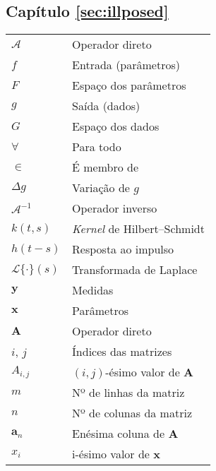 \begin{multicols}{2}

\subsection*{Capítulo \ref{sec:illposed}}
\noindent\begin{tabular}{ m{1.3cm} m{6.2cm}}
$\mathcal{A}$ & Operador direto \\
$ f $ &Entrada (parâmetros) \\
$F$  & Espaço dos parâmetros\\
$g$ &Saída (dados)  \\
$G$  & Espaço dos dados\\
$\forall$ & Para todo\\
$\in$ & 	É membro de\\
$\Delta g$ & Variação de $g$  \\
$\mathcal{A}^{-1}$ & Operador inverso \\
$k(t,s)$ &\textit{Kernel} de Hilbert–Schmidt  \\
$h(t-s)$ & Resposta ao impulso  \\ 
$\mathcal{L}\{\cdot\}(s) $ & Transformada de Laplace  \\
$\mathbf{y}$ &Medidas  \\
$\mathbf{x}$ &Parâmetros  \\
$\mathbf{A}$ &Operador direto \\
$i$, $j$ & Índices das matrizes  \\
$A_{i,j}$ & $(i,j)$-ésimo valor de $\mathbf{A}$ \\
$m$ & Nº de linhas da matriz  \\
 $n$ & Nº de colunas da matriz  \\
$\mathbf{a}_n$ &Enésima coluna de $\mathbf{A}$  \\
$x_i$ &i-ésimo valor de $\mathbf{x}$  \\
\end{tabular}


\end{multicols}
